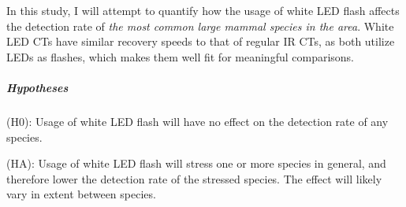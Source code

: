 In this study, I will attempt to quantify how the usage of white LED flash affects the detection rate of \textsl{the most common large mammal species in the area}. 
White LED CTs have similar recovery speeds to that of regular IR CTs, as both utilize LEDs as flashes, which makes them well fit for meaningful comparisons.

\subparagraph{Hypotheses}

(H0): Usage of white LED flash will have no effect on the detection rate of any species.

(HA): Usage of white LED flash will stress one or more species in general, and therefore lower the detection rate of the stressed species. The effect will likely vary in extent between species.



